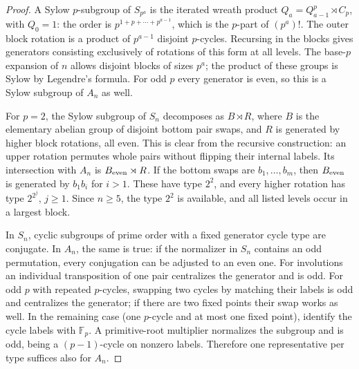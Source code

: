 \documentclass[11pt]{article}
\theoremstyle{remark}\newtheorem{remark}[theorem]{Remark}
\begin{document}
\begin{proof}
A Sylow $p$-subgroup of $S_{p^a}$ is the iterated wreath product
$Q_a=Q_{a-1}^p\rtimes C_p$, with $Q_0=1$: the order is
$p^{1+p+\cdots+p^{a-1}}$, which is the $p$-part of $(p^a)!$.
The outer block rotation is a product of $p^{a-1}$ disjoint $p$-cycles.
Recursing in the blocks gives generators consisting exclusively of
rotations of this form at all levels. The base-$p$ expansion of $n$
allows disjoint blocks of sizes $p^a$; the product of these groups is
Sylow by Legendre's formula. For odd $p$ every generator is even, so
this is a Sylow subgroup of $A_n$ as well.

For $p=2$, the Sylow subgroup of $S_n$ decomposes as $B\rtimes R$,
where $B$ is the elementary abelian group of disjoint bottom pair
swaps, and $R$ is generated by higher block rotations, all even.
This is clear from the recursive construction: an upper rotation
permutes whole pairs without flipping their internal labels. Its
intersection with $A_n$ is $B_{\rm even}\rtimes R$. If the bottom
swaps are $b_1,\ldots,b_m$, then $B_{\rm even}$ is generated by
$b_1b_i$ for $i>1$. These have type $2^2$, and every higher rotation
has type $2^{2^j}$, $j\ge1$. Since $n\ge5$, the type $2^2$ is
available, and all listed levels occur in a largest block.

In $S_n$, cyclic subgroups of prime order with a fixed generator cycle
type are conjugate. In $A_n$, the same is true: if the normalizer in
$S_n$ contains an odd permutation, every conjugation can be adjusted
to an even one. For involutions an individual transposition of one
pair centralizes the generator and is odd. For odd $p$ with repeated
$p$-cycles, swapping two cycles by matching their labels is odd and
centralizes the generator; if there are two fixed points their swap
works as well. In the remaining case (one $p$-cycle and at most one
fixed point), identify the cycle labels with $\mathbb F_p$. A
primitive-root multiplier normalizes the subgroup and is odd, being
a $(p-1)$-cycle on nonzero labels. Therefore one representative per
type suffices also for $A_n$.
\end{proof}
\end{document}
